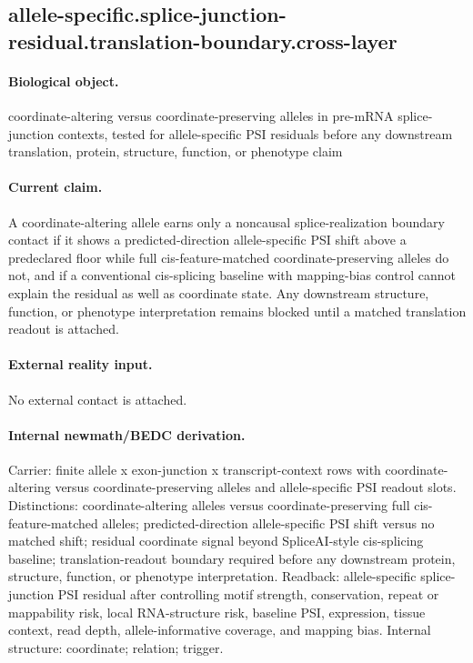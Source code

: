 \subsection{allele-specific.splice-junction-residual.translation-boundary.cross-layer}

\paragraph{Biological object.} coordinate-altering versus coordinate-preserving alleles in pre-mRNA splice-junction contexts, tested for allele-specific PSI residuals before any downstream translation, protein, structure, function, or phenotype claim

\paragraph{Current claim.} A coordinate-altering allele earns only a noncausal splice-realization boundary contact if it shows a predicted-direction allele-specific PSI shift above a predeclared floor while full cis-feature-matched coordinate-preserving alleles do not, and if a conventional cis-splicing baseline with mapping-bias control cannot explain the residual as well as coordinate state. Any downstream structure, function, or phenotype interpretation remains blocked until a matched translation readout is attached.

\paragraph{External reality input.}
No external contact is attached.

\paragraph{Internal newmath/BEDC derivation.} Carrier: finite allele x exon-junction x transcript-context rows with coordinate-altering versus coordinate-preserving alleles and allele-specific PSI readout slots. Distinctions: coordinate-altering alleles versus coordinate-preserving full cis-feature-matched alleles; predicted-direction allele-specific PSI shift versus no matched shift; residual coordinate signal beyond SpliceAI-style cis-splicing baseline; translation-readout boundary required before any downstream protein, structure, function, or phenotype interpretation. Readback: allele-specific splice-junction PSI residual after controlling motif strength, conservation, repeat or mappability risk, local RNA-structure risk, baseline PSI, expression, tissue context, read depth, allele-informative coverage, and mapping bias. Internal structure: coordinate; relation; trigger.

